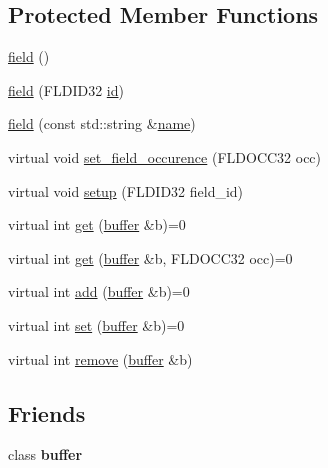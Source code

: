 \subsection*{Protected Member Functions}
\begin{DoxyCompactItemize}
\item 
\hyperlink{classatmi_1_1field_ad704c8d557c86b84b2d37bdf2cbdc36c}{field} ()
\item 
\hyperlink{classatmi_1_1field_a21cc47cdfd63932953b6476ca3c51183}{field} (F\+L\+D\+I\+D32 \hyperlink{classatmi_1_1field_a89ff294c8276c6a882f510a8f95ac372}{id})
\item 
\hyperlink{classatmi_1_1field_a6cc3f06d7251a520f6cb29a56ff5ccea}{field} (const std\+::string \&\hyperlink{classatmi_1_1field_a94aab112ec52966a2a772d219e87a965}{name})
\item 
virtual void \hyperlink{classatmi_1_1field_a83412cd9df383c342b5feb195090c9d9}{set\+\_\+field\+\_\+occurence} (F\+L\+D\+O\+C\+C32 occ)
\item 
virtual void \hyperlink{classatmi_1_1field_a9ca5e61e3e1068770098d20ad1332f24}{setup} (F\+L\+D\+I\+D32 field\+\_\+id)
\item 
virtual int \hyperlink{classatmi_1_1field_aae2d3df756e816b5db8f729039a59a51}{get} (\hyperlink{classatmi_1_1buffer}{buffer} \&b)=0
\item 
virtual int \hyperlink{classatmi_1_1field_a56ce53fabe290b94463f87936515ec46}{get} (\hyperlink{classatmi_1_1buffer}{buffer} \&b, F\+L\+D\+O\+C\+C32 occ)=0
\item 
virtual int \hyperlink{classatmi_1_1field_a5441bc87ba4bc3e9eb37c6db6a29688f}{add} (\hyperlink{classatmi_1_1buffer}{buffer} \&b)=0
\item 
virtual int \hyperlink{classatmi_1_1field_a41bb209965d627d2e67c839bece5372c}{set} (\hyperlink{classatmi_1_1buffer}{buffer} \&b)=0
\item 
virtual int \hyperlink{classatmi_1_1field_a783484fe641f66f5773f9eed7fd4be39}{remove} (\hyperlink{classatmi_1_1buffer}{buffer} \&b)
\end{DoxyCompactItemize}
\subsection*{Friends}
\begin{DoxyCompactItemize}
\item 
\hypertarget{classatmi_1_1field_afecbc2840248040e50fecb7164f912a9}{class {\bfseries buffer}}\label{classatmi_1_1field_afecbc2840248040e50fecb7164f912a9}

\end{DoxyCompactItemize}


